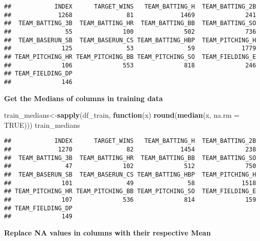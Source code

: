 \documentclass[
]{article}
\newenvironment{Shaded}{\begin{snugshade}}{\end{snugshade}}
\newcommand{\AttributeTok}[1]{\textcolor[rgb]{0.13,0.29,0.53}{#1}}
\newcommand{\ConstantTok}[1]{\textcolor[rgb]{0.56,0.35,0.01}{#1}}
\newcommand{\ControlFlowTok}[1]{\textcolor[rgb]{0.13,0.29,0.53}{\textbf{#1}}}
\newcommand{\FunctionTok}[1]{\textcolor[rgb]{0.13,0.29,0.53}{\textbf{#1}}}
\newcommand{\NormalTok}[1]{#1}
\newcommand{\OtherTok}[1]{\textcolor[rgb]{0.56,0.35,0.01}{#1}}
\begin{document}
\begin{verbatim}
##            INDEX      TARGET_WINS   TEAM_BATTING_H  TEAM_BATTING_2B 
##             1268               81             1469              241 
##  TEAM_BATTING_3B  TEAM_BATTING_HR  TEAM_BATTING_BB  TEAM_BATTING_SO 
##               55              100              502              736 
##  TEAM_BASERUN_SB  TEAM_BASERUN_CS TEAM_BATTING_HBP  TEAM_PITCHING_H 
##              125               53               59             1779 
## TEAM_PITCHING_HR TEAM_PITCHING_BB TEAM_PITCHING_SO  TEAM_FIELDING_E 
##              106              553              818              246 
## TEAM_FIELDING_DP 
##              146
\end{verbatim}

\textbf{Get the Medians of columns in training data}

\begin{Shaded}
\begin{Highlighting}[]
\NormalTok{train\_medians}\OtherTok{\textless{}{-}}\FunctionTok{sapply}\NormalTok{(df\_train, }\ControlFlowTok{function}\NormalTok{(x) }\FunctionTok{round}\NormalTok{(}\FunctionTok{median}\NormalTok{(x, }\AttributeTok{na.rm =} \ConstantTok{TRUE}\NormalTok{)))}
\NormalTok{train\_medians}
\end{Highlighting}
\end{Shaded}

\begin{verbatim}
##            INDEX      TARGET_WINS   TEAM_BATTING_H  TEAM_BATTING_2B 
##             1270               82             1454              238 
##  TEAM_BATTING_3B  TEAM_BATTING_HR  TEAM_BATTING_BB  TEAM_BATTING_SO 
##               47              102              512              750 
##  TEAM_BASERUN_SB  TEAM_BASERUN_CS TEAM_BATTING_HBP  TEAM_PITCHING_H 
##              101               49               58             1518 
## TEAM_PITCHING_HR TEAM_PITCHING_BB TEAM_PITCHING_SO  TEAM_FIELDING_E 
##              107              536              814              159 
## TEAM_FIELDING_DP 
##              149
\end{verbatim}

\textbf{Replace NA values in columns with their respective Mean}
\end{document}
